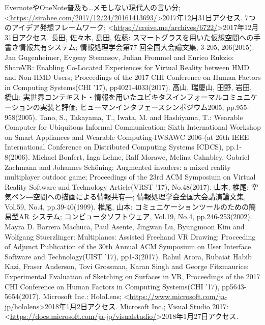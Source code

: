 \documentclass[11pt,a4j, titlepage]{jarticle} %
\begin{document}
\newpage
\begin{thebibliography}{数字}
   EvernoteやOneNote普及も…メモしない現代人の言い分; \textless\url{https://sirabee.com/2017/12/24/20161413693/}\textgreater2017年12月31日アクセス.
   7つのアイデア発想フレームワーク; \textless\url{https://creive.me/archives/6722/}\textgreater2017年12月31日アクセス.
   長田, 佐々木, 島田, 佐藤: スマートグラスを用いた仮想空間への手書き情報共有システム; 情報処理学会第77 回全国大会論文集, 3-205, 206(2015).
   	Jan Gugenheimer, Evgeny Stemasov, Julian Frommel and Enrico Rukzio: ShareVR: Enabling Co-Located Experiences for Virtual Reality between HMD and Non-HMD Users; Proceedings of the 2017 CHI Conference on Human Factors in Computing Systems(CHI '17), pp4021-4033(2017).
   高山, 瑞慶山, 田野, 岩田, 橋山: 実世界コンテキスト・情報を用いたユビキタスインフォーマルコミュニケーションの実装と評価; ヒューマンインタフェースシンポジウム2005, pp.955-958(2005).
   Tano, S., Takayama, T., Iwata, M. and Hashiyama, T.: Wearable Computer for Ubiquitous Informal Communication; Sixth International Workshop on Smart Appliances and Wearable Computing-IWSAWC 2006-(at 26th IEEE International Conference on Distributed Computing Systems
ICDCS), pp.1-8(2006).
   Michael Bonfert, Inga Lehne, Ralf Morawe, Melina Cahnbley, Gabriel Zachmann and Johannes Sch\"oning: Augmented invaders: a mixed reality multiplayer outdoor game; Proceedings of the 23rd ACM Symposium on Virtual Reality Software and Technology Article(VRST '17), No.48(2017).
   山本, 椎尾: 空気ペン―空間への描画による情報共有―; 情報処理学会全国大会講演論文集, Vol.59, No.4, pp.39-40(1999).
   椎尾, 山本: コミュニケーションツールのための簡易型AR システム; コンピュータソフトウェア, Vol.19, No.4, pp.246-253(2002).
   Mayra D. Barrera Machuca, Paul Asente, Jingwan Lu, Byungmoon Kim and Wolfgang Stuerzlinger: Multiplanes: Assisted Freehand VR Drawing; Proceeding of Adjunct Publication of the 30th Annual ACM Symposium on User Interface Software and Technology(UIST '17), pp1-3(2017).
   Rahul Arora, 	Rubaiat Habib Kazi, 	Fraser Anderson, Tovi Grossman, Karan Singh and George Fitzmaurice: Experimental Evaluation of Sketching on Surfaces in VR, Proceedings of the 2017 CHI Conference on Human Factors in Computing Systems(CHI '17), pp5643-5654(2017).
   Microsoft Inc.: HoloLens; \textless\url{https://www.microsoft.com/ja-jp/hololens}\textgreater2018年1月2日アクセス.
   Microsoft Inc.; Visual Studio 2017: \textless\url{https://docs.microsoft.com/ja-jp/visualstudio/}\textgreater2018年1月27日アクセス.

\end{thebibliography}
\end{document}
